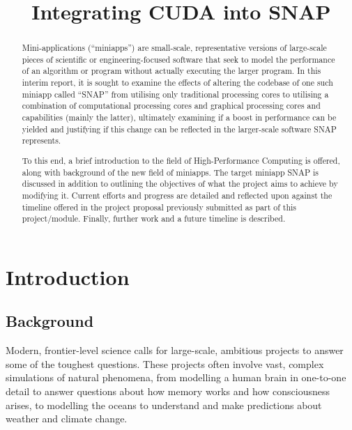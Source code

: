 \documentclass[conference]{IEEEtran}
\begin{document}
\title{Integrating CUDA into SNAP}

\author{
}


\maketitle



\begin{abstract}

Mini-applications (``miniapps'') are small-scale, representative versions of large-scale pieces of scientific or engineering-focused software that seek to model the performance of an algorithm or program without actually executing the larger program. In this interim report, it is sought to examine the effects of altering the codebase of one such miniapp called ``SNAP'' from utilising only traditional processing cores to utilising a combination of computational processing cores and graphical processing cores and capabilities (mainly the latter), ultimately examining if a boost in performance can be yielded and justifying if this change can be reflected in the larger-scale software SNAP represents.

To this end, a brief introduction to the field of High-Performance Computing is offered, along with background of the new field of miniapps. The target miniapp SNAP is discussed in addition to outlining the objectives of what the project aims to achieve by modifying it. Current efforts and progress are detailed and reflected upon against the timeline offered in the project proposal previously submitted as part of this project/module. Finally, further work and a future timeline is described.

\end{abstract}


\section{Introduction}

\subsection{Background}

Modern, frontier-level science calls for large-scale, ambitious projects to answer some of the toughest questions. These projects often involve vast, complex simulations of natural phenomena, from modelling a human brain in one-to-one detail to answer questions about how memory works and how consciousness arises, to modelling the oceans to understand and make predictions about weather and climate change.
\end{document}
